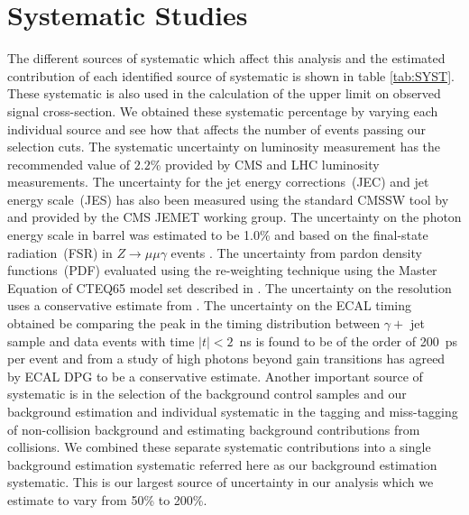 \section{Systematic Studies}
The different sources of systematic which affect this analysis and the estimated contribution of each identified source of systematic is shown in table \ref{tab:SYST}.
These systematic is also used in the calculation of the upper limit on observed signal cross-section. We obtained these systematic percentage by varying each individual source and see how that affects the number of events passing our selection cuts.
The systematic uncertainty on luminosity measurement has the recommended value of $2.2$\% provided by CMS and LHC luminosity measurements. The uncertainty for the jet energy corrections~(JEC) and jet energy scale~(JES) has also been measured using the standard CMSSW tool by \cite{JES} and provided by the CMS JEMET working group. The uncertainty on the photon energy scale in barrel was estimated to be 1.0\% and based on the final-state radiation~(FSR) in $Z\rightarrow \mu\mu\gamma$ events \cite{PES}. The uncertainty from pardon density functions~(PDF) evaluated using the re-weighting technique using the Master Equation of CTEQ65 model set described in \cite{PDF}. The uncertainty on the \MET resolution uses a conservative estimate from \cite{METRES}. The uncertainty on the ECAL timing obtained be comparing the peak in the timing distribution between $\gamma +$ jet sample and data events with time $|t| < 2$~ns is found to be of the order of 200~ps per event and from a study of high \pt photons beyond gain transitions has agreed by ECAL DPG to be a conservative estimate. Another important source of systematic is in the selection of the background control samples and our background estimation and individual systematic in the tagging and miss-tagging of non-collision background and estimating background contributions from collisions. We combined these separate systematic contributions into a single background estimation systematic referred here as our background estimation systematic. This is our largest source of uncertainty in our analysis which we estimate to vary from 50\% to 200\%. 


